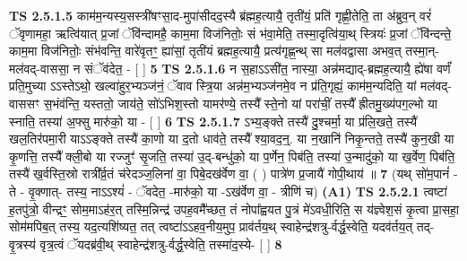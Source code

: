 \documentclass[17pt]{extarticle}
\begin{document}
                  \newline
                                \textbf{ TS 2.5.1.5} \newline
                  काम॑म॒न्यस्य॒सस्त्री॑षꣳसा॒द-मुपा॑सीदद॒स्यै ब्र॑ह्मह॒त्यायै॒ तृती॑यं॒ प्रति॑ गृह्णी॒तेति॒ ता अ॑ब्रुव॒न् वरं॑ ॅवृणामहा॒ ऋत्वि॑यात् प्र॒जां ॅवि॑न्दामहै॒ काम॒मा विज॑नितोः॒ सं भ॑वा॒मेति॒ तस्मा॒दृत्वि॑या॒थ् स्त्रियः॑ प्र॒जां ॅवि॑न्दन्ते॒ काम॒मा विज॑नितोः॒ संभ॑वन्ति॒ वारे॑वृतꣳ॒॒ ह्या॑सां॒ तृती॑यं ब्रह्मह॒त्यायै॒ प्रत्य॑गृह्ण॒न्थ् सा मल॑वद्वासा अभव॒त् तस्मा॒न्-मल॑वद्-वाससा॒ न संॅव॑देत॒ - [  ] \textbf{  5} \newline
                  \newline
                                \textbf{ TS 2.5.1.6} \newline
                  न स॒हाऽऽसी॑त॒ नास्या॒ अन्न॑मद्याद्-ब्रह्मह॒त्यायै॒ ह्ये॑षा वर्णं॑ प्रति॒मुच्या ऽऽस्तेऽथो॒ खल्वा॑हुर॒भ्यञ्ज॑नं॒ ॅवाव स्त्रि॒या अन्न॑म॒भ्यञ्ज॑नमे॒व न प्र॑ति॒गृह्यं॒ काम॑म॒न्यदिति॒ यां मल॑वद्-वाससꣳ स॒भंव॑न्ति॒ यस्ततो॒ जाय॑ते॒ सो॑ऽभिश॒स्तो यामर॑ण्ये॒ तस्यै᳚ स्ते॒नो यां परा॑चीं॒ तस्यै᳚ ह्रीतमु॒ख्य॑पग॒ल्भो या स्नाति॒ तस्या॑ अ॒फ्सु मारु॑को॒ या - [  ] \textbf{  6} \newline
                  \newline
                                \textbf{ TS 2.5.1.7} \newline
                  ऽभ्य॒ङ्क्ते तस्यै॑ दु॒श्चर्मा॒ या प्र॑लि॒खते॒ तस्यै॑ खल॒तिर॑पमा॒री याऽऽङ्क्ते तस्यै॑ का॒णो या द॒तो धाव॑ते॒ तस्यै᳚ श्या॒वद॒न्॒. या न॒खानि॑ निकृ॒न्तते॒ तस्यै॑ कुन॒खी या कृ॒णत्ति॒ तस्यै᳚ क्ली॒बो या रज्जुꣳ॑ सृ॒जति॒ तस्या॑ उ॒द्-बन्धु॑को॒ या प॒र्णेन॒ पिब॑ति॒ तस्या॑ उ॒न्मादु॑को॒ या ख॒र्वेण॒ पिब॑ति॒ तस्यै॑ ख॒र्वस्ति॒स्रो रात्री᳚र्व्र॒तं च॑रेदञ्ज॒लिना॑ वा॒ पिबे॒दख॑र्वेण वा॒ ( ) पात्रे॑ण प्र॒जायै॑ गोपी॒थाय॑ ॥ \textbf{  7} \newline
                  \newline
                      (यथ् सो॑म॒पानं॑ - ते - वृ॒क्णात्- तस्य॒ नाऽऽश्यं॑ - ॅवदेत॒ -मारु॑को॒ या -ऽख॑र्वेण वा॒ - त्रीणि॑ च)  \textbf{(A1)} \newline \newline
                                        \textbf{ TS 2.5.2.1} \newline
                  त्वष्टा॑ ह॒तपु॑त्रो॒ वीन्द्रꣳ॒॒ सोम॒माऽह॑र॒त् तस्मि॒न्निन्द्र॑ उपह॒वमै᳚च्छत॒ तं नोपा᳚ह्वयत पु॒त्रं मे॑ऽवधी॒रिति॒ स य॑ज्ञ्वेश॒सं कृ॒त्वा प्रा॒सहा॒ सोम॑मपिब॒त् तस्य॒ यद॒त्यशि॑ष्यत॒ तत् त्वष्टा॑ऽऽहव॒नीय॒मुप॒ प्राव॑र्तय॒थ् स्वाहेन्द्र॑शत्रु-र्वर्द्ध॒स्वेति॒ यदव॑र्तय॒त् तद्-वृ॒त्रस्य॑ वृत्र॒त्वं ॅयदब्र॑वी॒थ् स्वाहेन्द्र॑शत्रु-र्वर्द्ध॒स्वेति॒ तस्मा॑द॒स्ये- [  ] \textbf{  8} \newline
\end{document}
